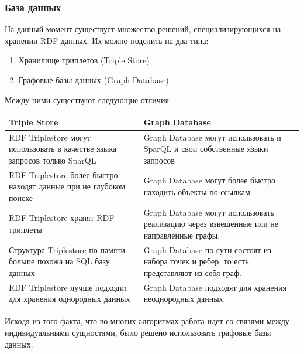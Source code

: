 \documentclass[12pt]{article}
\begin{document}
\subsubsection{База данных}
\qquad На данный момент существует множество решений, специализирующихся на хранении RDF данных. Их можно поделить на два типа:

\begin{enumerate}
    \item Хранилище триплетов (Triple Store)
    \item Графовые базы данных (Graph Database)
\end{enumerate}

Между ними существуют следующие отличия:

\begin{center}
    \begin{tabular}{ | m{7cm} | m{8cm} | }
        \hline
        \textbf{Triple Store}                                                      & \textbf{Graph Database}                                                                    \\
        \hline
        RDF Triplestore могут использовать в качестве языка запросов только SparQL & Graph Database могут использовать и SparQL и свои собственные языки запросов               \\
        \hline
        RDF Triplestore более быстро находят данные при не глубоком поиске         & Graph Database могут более быстро находить объекты по ссылкам                              \\
        \hline
        RDF Triplestore хранят RDF триплеты                                        & Graph Database могут использовать реализацию через взвешенные или не направленные графы.   \\
        \hline
        Структура Triplestore по памяти больше похожа на SQL базу данных           & Graph Database по сути состоят из набора точек и ребер, то есть представляют из себя граф. \\
        \hline
        RDF Triplestore лучше подходит для хранения однородных данных              & Graph Database подходят для хранения неоднородных данных.                                  \\
        \hline
    \end{tabular}
\end{center}

Исходя из того факта, что во многих алгоритмах работа идет со связями между индивидуальными сущностями, было решено использовать графовые базы данных.
\end{document}
